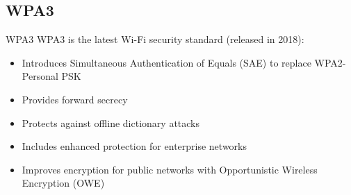 \subsection{WPA3}

\begin{definition}{WPA3}
WPA3 is the latest Wi-Fi security standard (released in 2018):
\begin{itemize}
    \item Introduces Simultaneous Authentication of Equals (SAE) to replace WPA2-Personal PSK
    \item Provides forward secrecy
    \item Protects against offline dictionary attacks
    \item Includes enhanced protection for enterprise networks
    \item Improves encryption for public networks with Opportunistic Wireless Encryption (OWE)
\end{itemize}
\end{definition}
